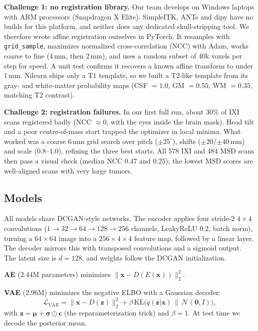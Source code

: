 \documentclass{article}
\begin{document}
\textbf{Challenge 1: no registration library.} Our team develops on Windows
laptops with ARM processors (Snapdragon X Elite). SimpleITK, ANTs and dipy have
no builds for this platform, and neither does any dedicated skull-stripping
tool. We therefore wrote affine registration ourselves in PyTorch. It resamples
with \texttt{grid\_sample}, maximizes normalized cross-correlation (NCC) with
Adam, works coarse to fine (4\,mm, then 2\,mm), and uses a random subset of
40k voxels per step for speed. A unit test confirms it recovers a known affine
transform to under 1\,mm. Nilearn ships only a T1 template, so we built a
T2-like template from its gray- and white-matter probability maps
(CSF $=1.0$, GM $=0.55$, WM $=0.35$, matching T2 contrast).

\textbf{Challenge 2: registration failures.} In our first full run, about 30\%
of IXI scans registered badly (NCC $\approx 0$, with the eyes inside the brain
mask). Head tilt and a poor centre-of-mass start trapped the optimizer in local
minima. What worked was a coarse 6\,mm grid search over pitch ($\pm 25^\circ$),
shifts ($\pm 20$/$\pm 40$\,mm) and scale ($0.8$--$1.0$), refining the three best
starts. All 578 IXI and 484 MSD scans then pass a visual check (median NCC
$0.47$ and $0.25$); the lowest MSD scores are well-aligned scans with very large
tumors.

\subsection{Models}

All models share DCGAN-style networks. The encoder applies four stride-2
$4\times4$ convolutions ($1{\to}32{\to}64{\to}128{\to}256$ channels,
LeakyReLU 0.2, batch norm), turning a $64\times64$ image into a $256\times4\times4$
feature map, followed by a linear layer. The decoder mirrors this with
transposed convolutions and a sigmoid output. The latent size is $d=128$, and
weights follow the DCGAN initialization.

\textbf{AE} (2.44M parameters) minimizes
$\|\mathbf{x}-D(E(\mathbf{x}))\|_2^2$.

\textbf{VAE} (2.96M) minimizes the negative ELBO with a Gaussian decoder:
\begin{equation}
\mathcal{L}_{\text{VAE}} = \|\mathbf{x}-D(\mathbf{z})\|_2^2
 + \beta\,\mathrm{KL}\big(q(\mathbf{z}|\mathbf{x})\,\|\,\mathcal{N}(\mathbf{0},I)\big),
\end{equation}
with $\mathbf{z}=\boldsymbol\mu+\boldsymbol\sigma\odot\boldsymbol\epsilon$
(the reparameterization trick) and $\beta=1$. At test time we decode the
posterior mean.
\end{document}
